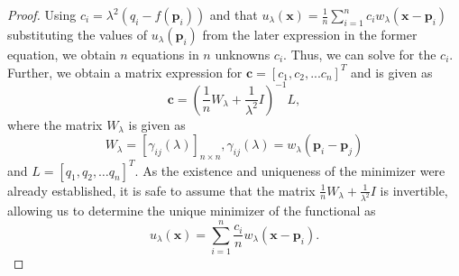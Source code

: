 \documentclass[multixcb]{amstext-l}
\theoremstyle{plain}
\theoremstyle{definition}
\theoremstyle{definition}
\theoremstyle{remark}
\numberwithin{equation}{chapter}
\begin{document}
\begin{appendix}
\begin{proof}
Using $c_i = \lambda^2(q_i-f(\boldsymbol{p}_i))$ and that $u_{\lambda}(\boldsymbol{x}) = \frac{1}{n}\sum\limits_{i = 1}^n c_i w_{\lambda}(\boldsymbol{x}-\boldsymbol{p}_i)$ substituting the values of $u_{\lambda}(\boldsymbol{p}_i)$ from the later expression in the former equation, we obtain $n$ equations in $n$ unknowns $c_i$. Thus, we can solve for the $c_i$. Further, we obtain a matrix expression for $\pmb{c} = [c_1,c_2,...c_{n}]^T$ and is given as \begin{equation}\label{eq28p}
 \pmb{c} = (\frac{1}{n}W_{\lambda}+\frac{1}{\lambda^2}I)^{-1}L,\end{equation} where the matrix $W_{\lambda}$ is given as 
\begin{equation}\label{eq29p}
  W_{\lambda} = [\gamma_{ij}(\lambda)]_{n\times n},\gamma_{ij}(\lambda) = w_{\lambda}(\boldsymbol{p}_i-\boldsymbol{p}_j)
  \end{equation} and $L = [q_1,q_2,\ldots q_n]^T$. As the existence and uniqueness of the minimizer were already established, it is safe to assume that the matrix $\frac{1}{n}W_{\lambda}+\frac{1}{\lambda^2}I$ is invertible, allowing us to determine the unique minimizer of the functional as \begin{equation}
    \label{expp}  
  u_{\lambda}(\boldsymbol{x}) = \sum\limits_{i=1}^n \frac{c_i}{n}w_{\lambda}(\boldsymbol{x}-\boldsymbol{p}_i).
 \end{equation}
 \end{proof}
\end{appendix}
\end{document}
